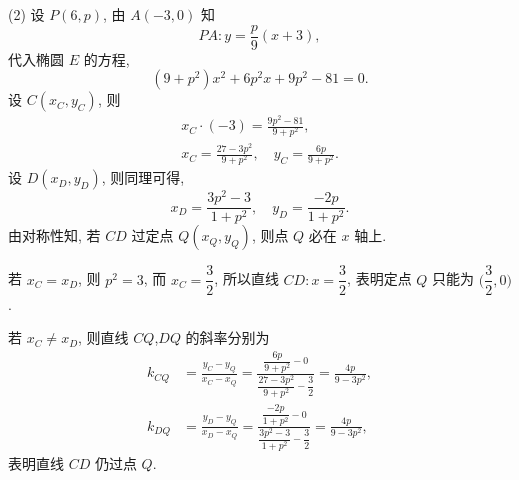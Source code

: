     (2) 设 $P(6,p)$, 由 $A(-3,0)$ 知
    \[PA\colon y= \frac{p}{9}(x+3),\]
    代入椭圆 $E$ 的方程,
    \[(9+p^2)x^2+ 6p^2x+ 9p^2-81= 0.\]
    设 $C(x_C,y_C)$, 则
    \[\begin{gathered}
        x_C\cdot (-3)= \frac{9p^2-81}{9+p^2},\\
        x_C= \frac{27-3p^2}{9+p^2},\quad
        y_C= \frac{6p}{9+p^2}.
    \end{gathered}\]
    设 $D(x_D,y_D)$, 则同理可得,
    \[x_D= \frac{3p^2-3}{1+p^2},\quad
        y_D= \frac{-2p}{1+p^2}.\]
    由对称性知, 若 $CD$ 过定点 $Q(x_Q,y_Q)$, 则点 $Q$ 必在 $x$ 轴上.

    若 $x_C= x_D$, 则 $p^2= 3$, 而 $x_C= \dfrac32$, 所以直线 $CD\colon x=\dfrac32$, 表明定点 $Q$ 只能为 $\biggl(\dfrac32,0\biggr)$.

    若 $x_C\neq x_D$, 则直线 $CQ$,$DQ$ 的斜率分别为
    \[\begin{aligned}
        k_{CQ}&= \frac{y_C- y_Q}{x_C- x_Q}
            = \frac{\dfrac{6p}{9+p^2}- 0}{
                \dfrac{27-3p^2}{9+p^2}- \dfrac32}
            = \frac{4p}{9-3p^2},\\
        k_{DQ}&= \frac{y_D- y_Q}{x_D- x_Q}
            = \frac{\dfrac{-2p}{1+p^2}- 0}{
                \dfrac{3p^2-3}{1+p^2}- \dfrac32}
            = \frac{4p}{9-3p^2},
    \end{aligned}\]
    表明直线 $CD$ 仍过点 $Q$.
\endsolution
